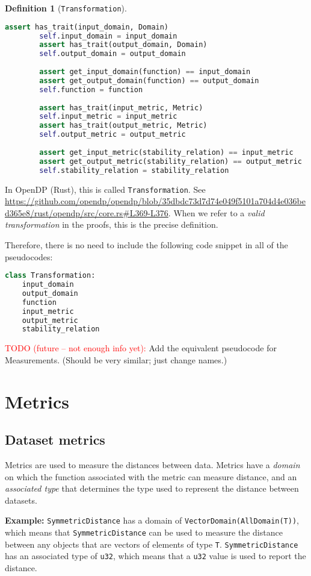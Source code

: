 \documentclass[11pt,a4paper]{article}
\theoremstyle{definition}
\newtheorem{definition}[theorem]{Definition}
\newcommand{\inOpenDPRust}[2]{In OpenDP (Rust), this is called \texttt{#1}. See \url{#2}.}
\newcommand{\todonei}{{\textcolor{red}{TODO (future -- not enough info yet): }}}
\begin{document}
\begin{definition}[\texttt{Transformation}]
\begin{lstlisting}[language=Python]
        assert has_trait(input_domain, Domain)
        self.input_domain = input_domain
        assert has_trait(output_domain, Domain)
        self.output_domain = output_domain
        
        assert get_input_domain(function) == input_domain
        assert get_output_domain(function) == output_domain
        self.function = function
        
        assert has_trait(input_metric, Metric)
        self.input_metric = input_metric
        assert has_trait(output_metric, Metric)
        self.output_metric = output_metric
        
        assert get_input_metric(stability_relation) == input_metric
        assert get_output_metric(stability_relation) == output_metric
        self.stability_relation = stability_relation
\end{lstlisting}
    
    \inOpenDPRust{Transformation}{https://github.com/opendp/opendp/blob/35dbdc73d7d74e049f5101a704d4e036bed365e8/rust/opendp/src/core.rs\#L369-L376} When we refer to a \textit{valid transformation} in the proofs, this is the precise definition.
\end{definition}

Therefore, there is no need to include the following code snippet in all of the pseudocodes:
\begin{lstlisting}[language=Python]
class Transformation:
    input_domain
    output_domain
    function
    input_metric
    output_metric
    stability_relation 
\end{lstlisting}

\todonei{Add the equivalent pseudocode for Measurements. (Should be very similar; just change names.)}

\section{Metrics}
\label{sec:metrics}
\subsection{Dataset metrics}
Metrics are used to measure the distances between data. Metrics have a \emph{domain} on which the function associated with the metric can measure distance, and an \emph{associated type} that determines the type used to represent the distance between datasets.

\textbf{Example:} \texttt{SymmetricDistance} has a domain of \texttt{VectorDomain(AllDomain(T))}, which means that \texttt{SymmetricDistance} can be used to measure the distance between any objects that are vectors of elements of type \texttt{T}. \texttt{SymmetricDistance} has an associated type of \texttt{u32}, which means that a \texttt{u32} value is used to report the distance.
\end{document}
